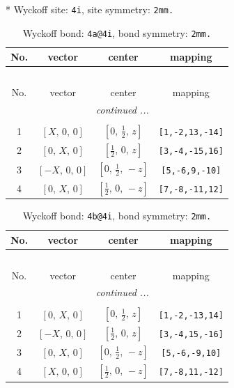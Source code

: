 \documentclass[fleqn,8pt]{jsarticle}
\begin{document}
* Wyckoff site: {\tt 4i}, site symmetry: {\tt 2mm.}
\renewcommand{\arraystretch}{1.2}
\begin{longtable}{cccc}
\caption{Wyckoff bond: {\tt 4a@4i}, bond symmetry: {\tt 2mm.}}
 \\
 \hline \hline
No. & vector & center & mapping \\ \hline \endfirsthead

\multicolumn{3}{l}{\tablename\ \thetable{}} \\
 \hline \hline
No. & vector & center & mapping \\ \hline \endhead

 \hline \hline
\multicolumn{3}{r}{\footnotesize\it continued ...} \\ \endfoot

 \hline \hline
\multicolumn{3}{r}{} \\ \endlastfoot

1 & $\left[ X,\, 0,\, 0 \right]$ & $\left[ 0,\, \frac{1}{2},\, z \right]$ & {\tt [1,-2,13,-14]} \\ \hline
2 & $\left[ 0,\, X,\, 0 \right]$ & $\left[ \frac{1}{2},\, 0,\, z \right]$ & {\tt [3,-4,-15,16]} \\ \hline
3 & $\left[ - X,\, 0,\, 0 \right]$ & $\left[ 0,\, \frac{1}{2},\, - z \right]$ & {\tt [5,-6,9,-10]} \\ \hline
4 & $\left[ 0,\, X,\, 0 \right]$ & $\left[ \frac{1}{2},\, 0,\, - z \right]$ & {\tt [7,-8,-11,12]} \\
\end{longtable}
\renewcommand{\arraystretch}{1.2}
\begin{longtable}{cccc}
\caption{Wyckoff bond: {\tt 4b@4i}, bond symmetry: {\tt 2mm.}}
 \\
 \hline \hline
No. & vector & center & mapping \\ \hline \endfirsthead

\multicolumn{3}{l}{\tablename\ \thetable{}} \\
 \hline \hline
No. & vector & center & mapping \\ \hline \endhead

 \hline \hline
\multicolumn{3}{r}{\footnotesize\it continued ...} \\ \endfoot

 \hline \hline
\multicolumn{3}{r}{} \\ \endlastfoot

1 & $\left[ 0,\, X,\, 0 \right]$ & $\left[ 0,\, \frac{1}{2},\, z \right]$ & {\tt [1,-2,-13,14]} \\ \hline
2 & $\left[ - X,\, 0,\, 0 \right]$ & $\left[ \frac{1}{2},\, 0,\, z \right]$ & {\tt [3,-4,15,-16]} \\ \hline
3 & $\left[ 0,\, X,\, 0 \right]$ & $\left[ 0,\, \frac{1}{2},\, - z \right]$ & {\tt [5,-6,-9,10]} \\ \hline
4 & $\left[ X,\, 0,\, 0 \right]$ & $\left[ \frac{1}{2},\, 0,\, - z \right]$ & {\tt [7,-8,11,-12]} \\
\end{longtable}
\end{document}
